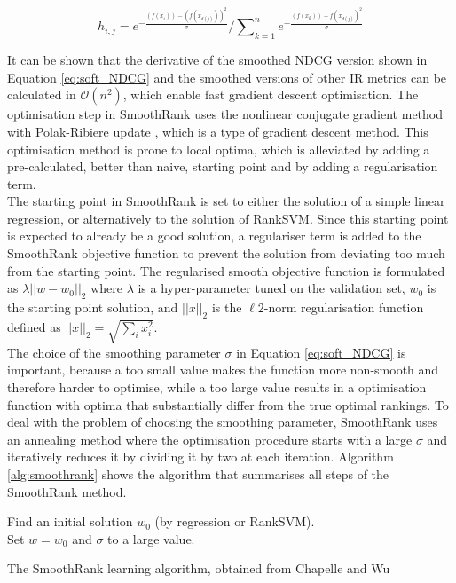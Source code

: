 \begin{equation}
h_{i,j} = e^{-\frac{(f(x_i))-(f(x_{d(j)}))^2}{\sigma}}\Big/\sum\nolimits_{k=1}^{n}e^{-\frac{(f(x_k))-f(x_{d(j)})^2}{\sigma}}
\label{eq:soft_NDCG}
\end{equation}

It can be shown that the derivative of the smoothed \ac{NDCG} version shown in Equation \ref{eq:soft_NDCG} and the smoothed versions of other \ac{IR} metrics can be calculated in $\mathcal{O}(n^2)$, which enable fast gradient descent optimisation. The optimisation step in SmoothRank uses the nonlinear conjugate gradient method  with Polak-Ribiere update \cite{Shewchuk1994}, which is a type of gradient descent method. This optimisation method is prone to local optima, which is alleviated by adding a pre-calculated, better than naive, starting point and by adding a regularisation term.\\

The starting point in SmoothRank is set to either the solution of a simple linear regression, or alternatively to the solution of Rank\acs{SVM}. Since this starting point is expected to already be a good solution, a regulariser term is added to the SmoothRank objective function to prevent the solution from deviating too much from the starting point. The regularised smooth objective function is formulated as $\lambda||w-w_0||_2$ where $\lambda$ is a hyper-parameter tuned on the validation set, $w_0$ is the starting point solution, and $||x||_2$ is the $\ell2$-norm regularisation function defined as $||x||_2 = \sqrt{\sum\nolimits_ix_i^2}$.\\

The choice of the smoothing parameter $\sigma$ in Equation \ref{eq:soft_NDCG} is important, because a too small value makes the function more non-smooth and therefore harder to optimise, while a too large value results in a optimisation function with optima that substantially differ from the true optimal rankings. To deal with the problem of choosing the smoothing parameter, SmoothRank uses an annealing method where the optimisation procedure starts with a large $\sigma$ and iteratively reduces it by dividing it by two at each iteration. Algorithm \ref{alg:smoothrank} shows the algorithm that summarises all steps of the SmoothRank method.\\

\LinesNumbered
\begin{algorithm}[H]
 Find an initial solution $w_0$ (by regression or Rank\acs{SVM}).\\
 Set $w = w_0$ and $\sigma$ to a large value.\\
 \caption{The SmoothRank learning algorithm, obtained from Chapelle and Wu \cite{Chapelle2010}}
 \label{alg:smoothrank}
\end{algorithm}


